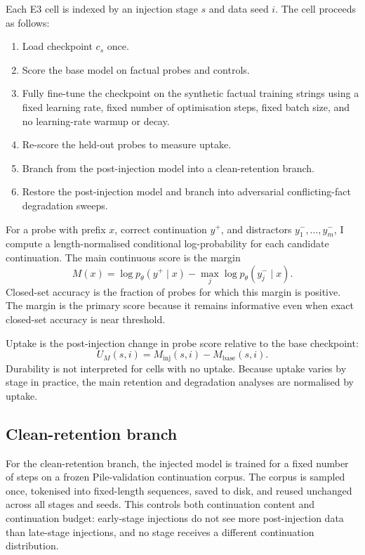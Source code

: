 Each E3 cell is indexed by an injection stage $s$ and data seed $i$.  The cell proceeds as follows:
\begin{enumerate}
    \item Load checkpoint $c_s$ once.
    \item Score the base model on factual probes and controls.
    \item Fully fine-tune the checkpoint on the synthetic factual training strings using a fixed learning rate, fixed number of optimisation steps, fixed batch size, and no learning-rate warmup or decay.
    \item Re-score the held-out probes to measure uptake.
    \item Branch from the post-injection model into a clean-retention branch.
    \item Restore the post-injection model and branch into adversarial conflicting-fact degradation sweeps.
\end{enumerate}

For a probe with prefix $x$, correct continuation $y^+$, and distractors $y^-_1,\ldots,y^-_m$, I compute a length-normalised conditional log-probability for each candidate continuation.  The main continuous score is the margin
\[
M(x) = \log p_\theta(y^+ \mid x) - \max_j \log p_\theta(y^-_j \mid x).
\]
Closed-set accuracy is the fraction of probes for which this margin is positive.  The margin is the primary score because it remains informative even when exact closed-set accuracy is near threshold.

Uptake is the post-injection change in probe score relative to the base checkpoint:
\[
U_M(s,i) = M_{\mathrm{inj}}(s,i) - M_{\mathrm{base}}(s,i).
\]
Durability is not interpreted for cells with no uptake.  Because uptake varies by stage in practice, the main retention and degradation analyses are normalised by uptake.

\subsection{Clean-retention branch}
\label{sec:method-e3-clean-retention}

For the clean-retention branch, the injected model is trained for a fixed number of steps on a frozen Pile-validation continuation corpus.  The corpus is sampled once, tokenised into fixed-length sequences, saved to disk, and reused unchanged across all stages and seeds.  This controls both continuation content and continuation budget: early-stage injections do not see more post-injection data than late-stage injections, and no stage receives a different continuation distribution.

